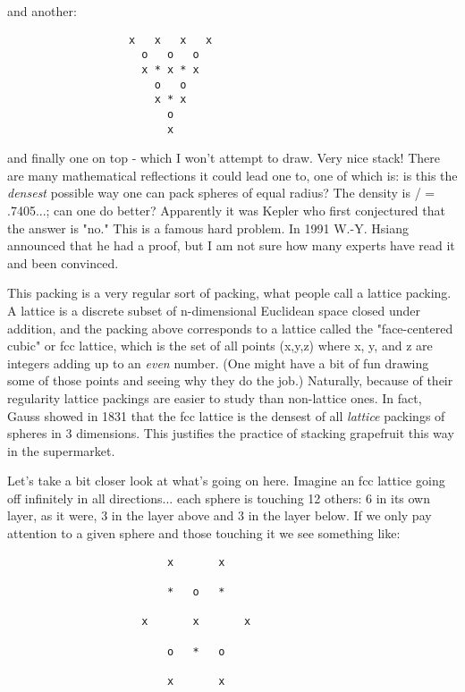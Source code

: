 and another:


\begin{verbatim}
                   x   x   x   x
                     o   o   o
                     x * x * x
                       o   o
                       x * x
                         o
                         x

\end{verbatim}
    

and finally one on top - which I won't attempt to draw.  Very nice
stack!  There are many mathematical reflections it could lead one to,
one of which is: is this the \emph{densest} possible way one can pack
spheres of equal radius?   The density is \pi / = .7405...; can one
do better?   Apparently it was Kepler who first conjectured that the
answer is "no."  This is a famous hard problem.  In 1991 W.-Y. Hsiang
announced that he had a proof, but I am not sure how many experts have
read it and been convinced.  

This packing is a very regular sort of packing, what people call a
lattice packing.  A lattice is a discrete subset of n-dimensional
Euclidean space closed under addition, and the packing above corresponds
to a lattice called the "face-centered cubic" or fcc lattice, which is
the set of all points (x,y,z) where x, y, and z are integers adding up
to an \emph{even} number.  (One might have a bit of fun drawing some of those
points and seeing why they do the job.)  Naturally, because of their
regularity lattice packings are easier to study than non-lattice ones.
In fact, Gauss showed in 1831 that the fcc lattice is the densest of all
\emph{lattice} packings of spheres in 3 dimensions.  This justifies the
practice of stacking grapefruit this way in the supermarket.

Let's take a bit closer look at what's going on here.  Imagine an fcc
lattice going off infinitely in all directions... each sphere is
touching 12 others: 6 in its own layer, as it were, 3 in the layer above
and 3 in the layer below.  If we only pay attention to a given sphere
and those touching it we see something like:


\begin{verbatim}
                         x       x   

                         *   o   * 
 
                     x       x       x

                         o   *   o

                         x       x
                         
\end{verbatim}
    
